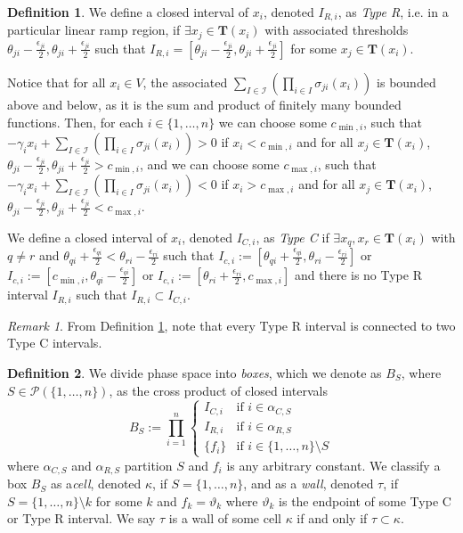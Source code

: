 \documentclass[12pt]{article}
\theoremstyle{definition}
\newtheorem{defn}{Definition}[section]
\theoremstyle{remark}
\newtheorem{remark}{Remark}[section]
\begin{document}
\begin{defn}	\label{IntervalType}
We define a closed interval of $x_i$, denoted $I_{R,i}$, as \textit{Type R}, i.e. in a particular linear ramp region, if $\exists x_j\in\mathbf{T}(x_i)$ with associated thresholds $\theta_{ji}-\frac{\epsilon_{ji}}{2},\theta_{ji}+\frac{\epsilon_{ji}}{2}$ such that $I_{R,i}=\left[\theta_{ji}-\frac{\epsilon_{ji}}{2},\theta_{ji}+\frac{\epsilon_{ji}}{2}\right]$ for some $x_j \in \mathbf{T}(x_i)$.

Notice that for all $x_i\in V$, the associated $\sum_{I\in \mathcal{I}}\left(\prod_{i\in I}\sigma_{ji}(x_i)\right)$ is bounded above and below, as it is the sum and product of finitely many bounded functions. Then, for each $i\in\{1,\dots,n\}$  we can choose some $c_{\min,i}$, such that $-\gamma_i x_i + \sum_{I\in \mathcal{I}}\left(\prod_{i\in I}\sigma_{ji}(x_i)\right)>0$ if $x_i<c_{\min,i}$ and for all $x_j\in\mathbf{T}(x_i)$, $\theta_{ji}-\frac{\epsilon_{ji}}{2},\theta_{ji}+\frac{\epsilon_{ji}}{2}>c_{\min,i}$, and we can choose some $c_{\max,i}$, such that $-\gamma_i x_i + \sum_{I\in \mathcal{I}}\left(\prod_{i\in I}\sigma_{ji}(x_i)\right)<0$ if $x_i>c_{\max,i}$ and for all $x_j\in\mathbf{T}(x_i)$, $\theta_{ji}-\frac{\epsilon_{ji}}{2},\theta_{ji}+\frac{\epsilon_{ji}}{2}<c_{\max,i}$.

We define a closed interval of $x_i$, denoted $I_{C,i}$, as \textit{Type C} if $\exists x_q,x_r \in \mathbf{T}(x_i)$ with $q\neq r$ and $\theta_{qi}+\frac{\epsilon_{qi}}{2}<\theta_{ri}-\frac{\epsilon_{ri}}{2}$ such that $I_{c,i}:=[\theta_{qi}+\frac{\epsilon_{qi}}{2},\theta_{ri}-\frac{\epsilon_{ri}}{2}]$ or $I_{c,i}:=[c_{\min,i},\theta_{qi}-\frac{\epsilon_{qi}}{2}]$ or $I_{c,i}:=[\theta_{ri}+\frac{\epsilon_{ri}}{2},c_{\max,i}]$ and there is no Type R interval $I_{R,i}$ such that $I_{R,i}\subset I_{C,i}$. 
\end{defn}

\begin{remark}
From Definition \ref{IntervalType}, note that every Type R interval is connected to two Type C intervals.
\end{remark}

\begin{defn}
We divide phase space into \textit{boxes}, which we denote as $B_S$, where $S\in\mathscr{P}(\{1,\dots,n\})$, as the cross product of closed intervals 
\begin{equation*}
B_S:=\prod^{n}_{i=1} 
\begin{cases}
I_{C,i} & \text{if } i\in\alpha_{C,S}\\
I_{R,i} & \text{if } i\in\alpha_{R,S}\\
\{f_i\} & \text{if } i\in \{1,\dots,n\}\setminus S
\end{cases}
\end{equation*}
where $\alpha_{C,S}$ and $\alpha_{R,S}$ partition $S$ and $f_i$ is any arbitrary constant. We classify a box $B_S$ as a\textit{cell}, denoted $\kappa$, if $S=\{1,\dots,n\}$, and as a \textit{wall}, denoted $\tau$, if $S=\{1,\dots,n\}\setminus k$ for some $k$ and $f_k=\vartheta_k$ where $\vartheta_k$ is the endpoint of some Type C or Type R interval. We say $\tau$ is a wall of some cell $\kappa$ if and only if $\tau\subset \kappa$.
\end{defn}
\end{document}
